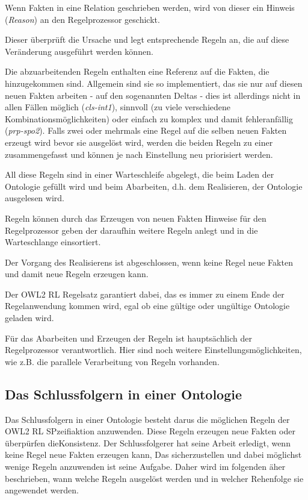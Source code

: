 Wenn Fakten in eine Relation geschrieben werden, wird von dieser ein Hinweis (\emph{Reason}) an den Regelprozessor geschickt.

Dieser überprüft die Ursache und legt entsprechende Regeln an, die auf diese Veränderung ausgeführt werden können.

Die abzuarbeitenden Regeln enthalten eine Referenz auf die Fakten, die hinzugekommen sind. Allgemein sind sie so implementiert, das sie nur auf diesen neuen Fakten arbeiten -  auf den sogenannten Deltas - dies ist allerdings nicht in allen Fällen möglich (\emph{cls-int1}), sinnvoll (zu viele verschiedene Kombinationsmöglichkeiten) oder einfach zu komplex und damit fehleranfällig (\emph{prp-spo2}). Falls zwei oder mehrmals eine Regel auf die selben neuen Fakten erzeugt wird bevor sie ausgelöst wird, werden die beiden Regeln zu einer zusammengefasst und können je nach Einstellung neu priorisiert werden.

All diese Regeln sind in einer Warteschleife abgelegt, die beim Laden der Ontologie gefüllt wird und beim Abarbeiten, d.h. dem Realisieren, der Ontologie ausgelesen wird.

Regeln können durch das Erzeugen von neuen Fakten Hinweise für den Regelprozessor geben der daraufhin weitere Regeln anlegt und in die Warteschlange einsortiert.

Der Vorgang des Realisierens ist abgeschlossen, wenn keine Regel neue Fakten und damit neue Regeln erzeugen kann.

Der OWL2 RL Regelsatz garantiert dabei, das es immer zu einem Ende der Regelanwendung kommen wird, egal ob eine gültige oder ungültige Ontologie geladen wird.

Für das Abarbeiten und Erzeugen der Regeln ist hauptsächlich der Regelprozessor verantwortlich. Hier sind noch weitere Einstellungsmöglichkeiten, wie z.B. die parallele Verarbeitung von Regeln vorhanden.


\subsection{Das Schlussfolgern in einer Ontologie}
Das Schlussfolgern in einer Ontologie besteht darus die möglichen Regeln der OWL2 RL SPzeifiaktion anzuwenden. Diese Regeln erzeugen neue Fakten oder überpürfen dieKonsistenz. Der Schlussfolgerer hat seine Arbeit erledigt, wenn keine Regel neue Fakten erzeugen kann, Das sicherzustellen und dabei möglichst wenige Regeln anzuwenden ist seine Aufgabe. Daher wird im folgenden äher beschrieben, wann welche Regeln ausgelöst werden und in welcher Rehenfolge sie angewendet werden.

